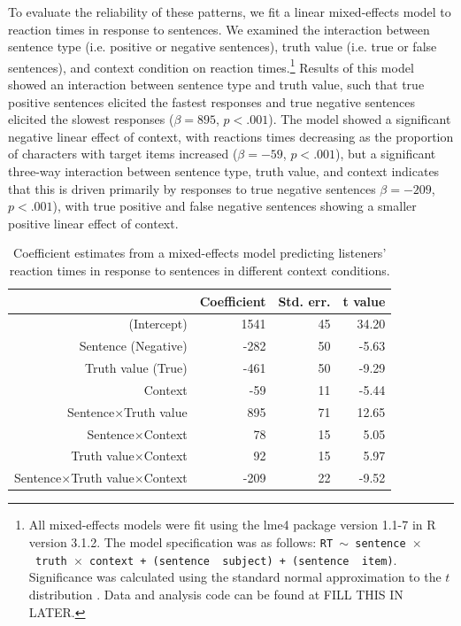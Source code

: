 \documentclass[man, noapacite]{apa2}
\begin{document}
To evaluate the reliability of these patterns, we fit a linear mixed-effects model to reaction times in response to sentences.  We examined the interaction between sentence type (i.e. positive or negative sentences), truth value (i.e. true or false sentences), and context condition on reaction times.\footnote{All mixed-effects models were fit using the lme4 package version 1.1-7 in R version 3.1.2.  The model specification was as follows: \texttt{RT $\sim$ sentence~$\times$~truth~$\times$~context + (sentence~\textbar~subject) +  (sentence~\textbar~item)}.  Significance was calculated using the standard normal approximation to the $t$ distribution \cite{barr2013}. Data and analysis code can be found at FILL THIS IN LATER.}  Results of this model showed an interaction between sentence type and truth value, such that true positive sentences elicited the fastest responses and true negative sentences elicited the slowest responses ($\beta= 895$, $p< .001$).  The model showed a significant negative linear effect of context, with reactions times decreasing as the proportion of characters with target items increased ($\beta= -59$, $p< .001$), but a significant three-way interaction between sentence type, truth value, and context indicates that this is driven primarily by responses to true negative sentences $\beta= -209$, $p< .001$), with true positive and false negative sentences showing a smaller positive linear effect of context.  

\begin{table}[t]
\caption{Coefficient estimates from a mixed-effects model predicting listeners' reaction times in response to sentences in different context conditions.}
\begin{center}
\small\addtolength{\tabcolsep}{-5pt}
\begin{tabular}{rrrr}
  \hline
 & Coefficient & Std. err. & t value \\ 
  \hline
(Intercept) & 1541 & 45 & 34.20 \\ 
  Sentence (Negative) & -282 & 50 & -5.63  \\ 
  Truth value (True) & -461 & 50 & -9.29 \\
  Context & -59 & 11 & -5.44 \\ 
  Sentence$\times$Truth value & 895 & 71 & 12.65 \\
  Sentence$\times$Context & 78 & 15 & 5.05 \\
  Truth value$\times$Context & 92 & 15 & 5.97 \\
  Sentence$\times$Truth value$\times$Context & -209 & 22 & -9.52 \\
   \hline
\end{tabular}
\vspace{-1.5cm}
\end{center}
\end{table}
\end{document}

